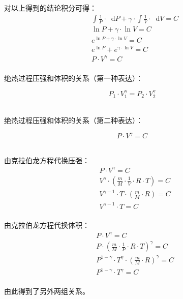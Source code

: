 \documentclass[UTF8]{ctexart}
\newcommand*{\dif}{\mathop{}\!\mathrm{d}}
\begin{document}
\newpage

    对以上得到的结论积分可得：
    \begin{align}
        &\int\frac{1}{P}\cdot\dif P+\gamma\cdot\int\frac{1}{V}\cdot\dif V=C\\[3mm]
        &\ln{P}+\gamma\cdot\ln{V}=C\\[3mm]
        &e^{\ln{P}+\gamma\cdot\ln{V}}=C\\[3mm]
        &e^{\ln{P}}+e^{\gamma\cdot\ln{V}}=C\\[3mm]
        &P\cdot V^{\gamma}=C
    \end{align}\\
    绝热过程压强和体积的关系（第一种表达）：
    \begin{large}
        \begin{equation*}
            P_1\cdot V_1^{\gamma}=P_2\cdot V_2^{\gamma}
        \end{equation*}
    \end{large}\\
    绝热过程压强和体积的关系（第二种表达）：
    \begin{large}
        \begin{equation*}
            P\cdot V^{\gamma}=C
        \end{equation*}
    \end{large}\\
    由克拉伯龙方程代换压强：
    \begin{align}
        &P\cdot V^{\gamma}=C\\[3mm]
        &V^{\gamma}\cdot\left(\frac{m}{M}\cdot\frac{1}{V}\cdot R\cdot T\right)=C\\[3mm]
        &V^{\gamma-1}\cdot T\cdot\left(\frac{m}{M}\cdot R\right)=C\\[3mm]
        &V^{\gamma-1}\cdot T=C
    \end{align}\\
    由克拉伯龙方程代换体积：
    \begin{align}
        &P\cdot V^{\gamma}=C\\[3mm]
        &P\cdot\left(\frac{m}{M}\cdot\frac{1}{P}\cdot R\cdot T\right)^{\gamma}=C\\[3mm]
        &P^{1-\gamma}\cdot T^{\gamma}\cdot\left(\frac{m}{M}\cdot R\right)^{\gamma}=C\\[3mm]
        &P^{1-\gamma}\cdot T^{\gamma}=C
    \end{align}\\
    由此得到了另外两组关系。

\newpage
\end{document}
